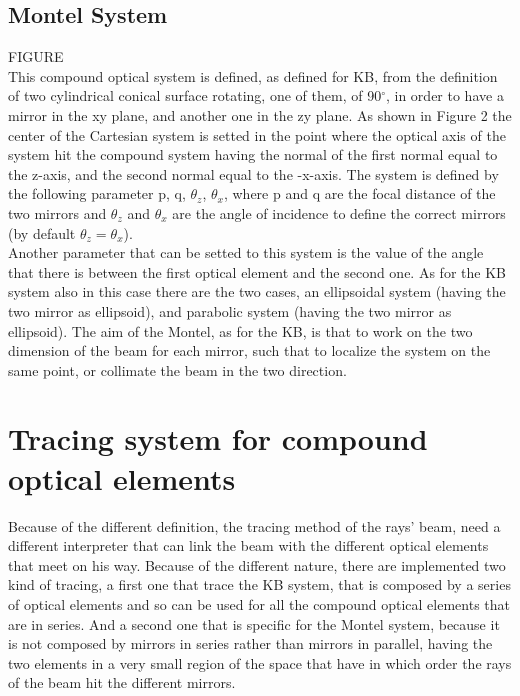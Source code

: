 \subsection{Montel System}
FIGURE
\\
This compound optical system is defined, as defined for KB, from the definition of two cylindrical conical surface rotating, one of them, of 90$^\circ $, in order to have a mirror in the xy plane, and another one in the zy plane. As shown in Figure 2 the center of the Cartesian system is setted in the point where the  optical axis of the system hit the compound system having the normal of the first normal equal to the z-axis, and the second normal equal to the -x-axis. The system is defined by the following parameter p, q, $\theta_z $, $\theta_x $, where p and q are the focal distance of the two mirrors and $\theta_z $ and $\theta_x $ are the angle of incidence to define the correct mirrors  (by default $\theta_z = \theta_x $).
\\
Another parameter that can be setted to this system is the value of the angle that there is between the first optical element and the second one. As for the KB system also in this case there are the two cases, an ellipsoidal system (having the two mirror as ellipsoid), and parabolic system (having the two mirror as ellipsoid). The aim of the Montel, as for the KB, is that to work on the two dimension of the beam for each mirror, such that to localize the system on the same point, or collimate the beam in the two direction.

\section{Tracing system for compound optical elements}
Because of the different definition, the tracing method of the rays' beam, need a different interpreter that can link the beam with the different optical elements that meet on his way. Because of the different nature, there are implemented two kind of tracing, a first one that trace the KB system, that is composed by a series of optical elements and so can be used for all the compound optical elements that are in series. And a second one that is specific for the Montel system, because it is not composed by mirrors in series rather than mirrors in parallel, having the two elements in a very small region of the space that have in which order the rays of the beam hit the different mirrors.
